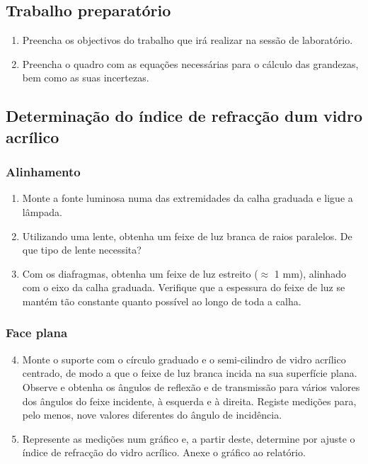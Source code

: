 \documentclass[12pt,a4paper,oneside]{paper}
\begin{document}
\subsection*{\sf Trabalho preparatório} 
\begin{enumerate}
\item Preencha os objectivos do trabalho que irá realizar na sessão de laboratório. 
\item Preencha o quadro com as equações necessárias para o cálculo das grandezas, bem como as suas incertezas. 
\end{enumerate}

\subsection{\sf  Determinação do índice de refracção dum vidro acrílico }
\subsubsection*{\sf Alinhamento}
\begin{enumerate}
\item Monte a fonte luminosa numa das extremidades da calha graduada e ligue a lâmpada.
\item Utilizando uma lente, obtenha  um  feixe  de  luz  branca  de  raios  paralelos. De que tipo de lente necessita?
\item Com os diafragmas, obtenha um feixe de luz estreito ($\approx$ 1 mm), alinhado com o eixo da calha graduada.
Verifique que a espessura do feixe de luz se mantém tão constante quanto possível ao longo de toda a calha.
\end{enumerate}

\subsubsection*{\sf Face plana}
\begin{enumerate}
 \setcounter{enumi}{3}
\item Monte o suporte com o círculo graduado e o semi-cilindro  de  vidro  acrílico centrado, de modo a que o feixe de luz
branca incida na sua superfície  plana.  Observe  e obtenha os ângulos de reflexão e de transmissão para vários valores dos
ângulos do feixe incidente, à esquerda e à direita.  Registe medições  para, pelo  menos,  nove  valores  diferentes  do
ângulo de incidência.
\item Represente as medições num gráfico e, a partir deste, determine por ajuste o índice de refracção do vidro acrílico. 
Anexe o gráfico ao relatório.
\end{enumerate}
\end{document}
